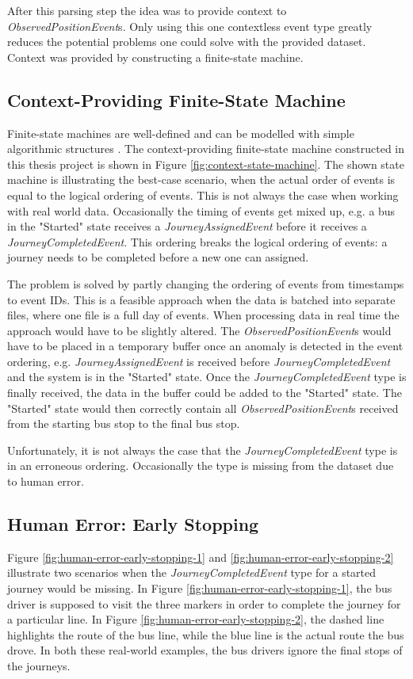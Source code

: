 After this parsing step the idea was to provide context to \textit{ObservedPositionEvent}s.
Only using this one contextless event type greatly reduces the potential problems one could solve with the provided dataset.
Context was provided by constructing a finite-state machine.

\subsection{Context-Providing Finite-State Machine}
Finite-state machines are well-defined  and can be modelled with simple algorithmic structures .
The context-providing finite-state machine constructed in this thesis project is shown in Figure \ref{fig:context-state-machine}.
The shown state machine is illustrating the best-case scenario, when the actual order of events is equal to the logical ordering of events.
This is not always the case when working with real world data.
Occasionally the timing of events get mixed up, e.g. a bus in the "Started" state receives a \textit{JourneyAssignedEvent} before it receives a \textit{JourneyCompletedEvent}.
This ordering breaks the logical ordering of events: a journey needs to be completed before a new one can assigned.

The problem is solved by partly changing the ordering of events from timestamps to event IDs.
This is a feasible approach when the data is batched into separate files, where one file is a full day of events.
When processing data in real time the approach would have to be slightly altered.
The \textit{ObservedPositionEvent}s would have to be placed in a temporary buffer once an anomaly is detected in the event ordering, e.g. \textit{JourneyAssignedEvent} is received before \textit{JourneyCompletedEvent} and the system is in the "Started" state.
Once the \textit{JourneyCompletedEvent} type is finally received, the data in the buffer could be added to the "Started" state.
The "Started" state would then correctly contain all \textit{ObservedPositionEvent}s received from the starting bus stop to the final bus stop.


Unfortunately, it is not always the case that the \textit{JourneyCompletedEvent} type is in an erroneous ordering.
Occasionally the type is missing from the dataset due to human error.

\subsection{Human Error: Early Stopping}
Figure \ref{fig:human-error-early-stopping-1} and \ref{fig:human-error-early-stopping-2} illustrate two scenarios when the \textit{JourneyCompletedEvent} type for a started journey would be missing.
In Figure \ref{fig:human-error-early-stopping-1}, the bus driver is supposed to visit the three markers in order to complete the journey for a particular line.
In Figure \ref{fig:human-error-early-stopping-2}, the dashed line highlights the route of the bus line, while the blue line is the actual route the bus drove.
In both these real-world examples, the bus drivers ignore the final stops of the journeys.

